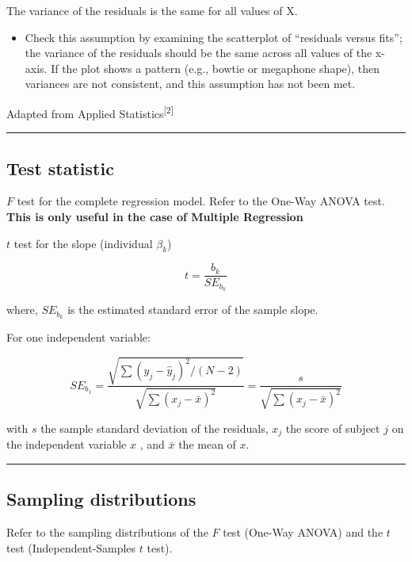 \documentclass[
]{article}
\providecommand{\tightlist}{%
  \setlength{\itemsep}{0pt}\setlength{\parskip}{0pt}}
\begin{document}
The variance of the residuals is the same for all values of X.

\begin{itemize}
\tightlist
\item
  Check this assumption by examining the scatterplot of ``residuals versus fits''; the variance of the residuals should be the same across all values of the x-axis. If the plot shows a pattern (e.g., bowtie or megaphone shape), then variances are not consistent, and this assumption has not been met.
\end{itemize}

Adapted from Applied Statistics\textsuperscript{{[}2{]}}

\begin{center}\rule{0.5\linewidth}{0.5pt}\end{center}

\hypertarget{test-statistic-1}{%
\subsection{Test statistic}\label{test-statistic-1}}

\(F\) test for the complete regression model. Refer to the One-Way ANOVA test. \textbf{This is only useful in the case of Multiple Regression}

\(t\) test for the slope (individual \(\beta_k\))

\[
t = \dfrac{b_k}{SE_{b_k}}
\]

where, \(SE_{b_k}\) is the estimated standard error of the sample slope.

For one independent variable:

\[
SE_{b_1} = \dfrac{\sqrt{\sum (y_j - \hat{y}_j)^2 / (N - 2)}}{\sqrt{\sum (x_j - \bar{x})^2}} = \dfrac{s}{\sqrt{\sum (x_j - \bar{x})^2}}
\]

with \(s\) the sample standard deviation of the residuals, \(x_j\) the score of subject \(j\) on the independent variable \(x\) , and \(\bar{x}\) the mean of \(x\).

\begin{center}\rule{0.5\linewidth}{0.5pt}\end{center}

\hypertarget{sampling-distributions}{%
\subsection{Sampling distributions}\label{sampling-distributions}}

Refer to the sampling distributions of the \(F\) test (One-Way ANOVA) and the \(t\) test (Independent-Samples \(t\) test).
\end{document}
